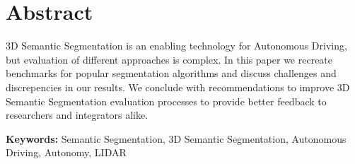 \section*{Abstract}

3D Semantic Segmentation is an enabling technology for Autonomous Driving, but evaluation of different approaches is complex. In this paper we recreate benchmarks for popular segmentation algorithms and discuss challenges and discrepencies in our results. We conclude with recommendations to improve 3D Semantic Segmentation evaluation processes to provide better feedback to researchers and integrators alike.

\vspace{.5cm}

\textbf{Keywords:} Semantic Segmentation, 3D Semantic Segmentation, Autonomous Driving, Autonomy, LIDAR
\newpage
